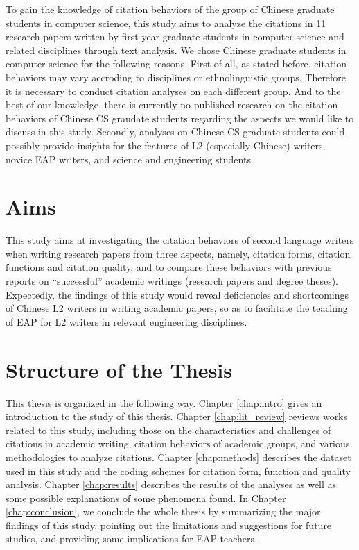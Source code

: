 To gain the knowledge of citation behaviors of the group of Chinese graduate students in computer science, this study aims to analyze the citations in 11 research papers written by first-year graduate students in computer science and related disciplines through text analysis. We chose Chinese graduate students in computer science for the following reasons. First of all, as stated before, citation behaviors may vary accroding to disciplines or ethnolinguistic groups. Therefore it is necessary to conduct citation analyses on each different group. And to the best of our knowledge, there is currently no published research on the citation behaviors of Chinese CS graudate students regarding the aspects we would like to discuss in this study. Secondly, analyses on Chinese CS graduate students could possibly provide insights for the features of L2 (especially Chinese) writers, novice EAP writers, and science and engineering students.

\section{Aims}
This study aims at investigating the citation behaviors of second language writers when writing research papers from three aspects, namely, citation forms, citation functions and citation quality, and to compare these behaviors with previous reports on “successful” academic writings (research papers and degree theses). Expectedly, the findings of this study would reveal deficiencies and shortcomings of Chinese L2 writers in writing academic papers, so as to facilitate the teaching of EAP for L2 writers in relevant engineering disciplines.

\section{Structure of the Thesis}
This thesis is organized in the following way. Chapter \ref{chap:intro} gives an introduction to the study of this thesis. Chapter \ref{chap:lit_review} reviews works related to this study, including those on the characteristics and challenges of citations in academic writing, citation behaviors of academic groups, and various methodologies to analyze citations. Chapter \ref{chap:methods} describes the dataset used in this study and the coding schemes for citation form, function and quality analysis. Chapter \ref{chap:results} describes the results of the analyses as well as some possible explanations of some phenomena found. In Chapter \ref{chap:conclusion}, we conclude the whole thesis by summarizing the major findings of this study, pointing out the limitations and suggestions for future studies, and providing some implications for EAP teachers.